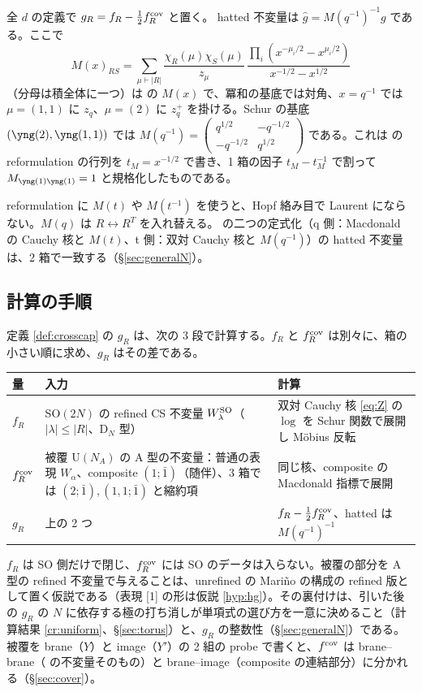 \begin{definition}\label{def:crosscap}
全 $d$ の定義で $g_R = f_R - \tfrac12 f^{\mathrm{cov}}_R$ と置く。
hatted 不変量は $\hat g = M(q^{-1})^{-1} g$ である。ここで
\[
M(x)_{RS} = \sum_{\mu \vdash |R|} \frac{\chi_R(\mu)\chi_S(\mu)}{z_\mu}\,\frac{\prod_i (x^{-\mu_i/2} - x^{\mu_i/2})}{x^{-1/2} - x^{1/2}}
\]
（分母は積全体に一つ）は \cite{KN17} の $M(x)$ で、冪和の基底では対角、$x = q^{-1}$ では $\mu = (1,1)$ に $z_q$、$\mu = (2)$ に $z_q^+$ を掛ける。Schur の基底 $(\ytwo, \yoneone)$ では $M(q^{-1}) = \begin{pmatrix} q^{1/2} & -q^{-1/2} \\ -q^{-1/2} & q^{1/2}\end{pmatrix}$ である。これは \cite{Marino09} の reformulation の行列を $t_M = x^{-1/2}$ で書き、1 箱の因子 $t_M - t_M^{-1}$ で割って $M_{\yone\yone} = 1$ と規格化したものである。
\end{definition}

\begin{remark}
reformulation に $M(t)$ や $M(t^{-1})$ を使うと、Hopf 絡み目で Laurent にならない。$M(q)$ は $R \leftrightarrow R^T$ を入れ替える。
\cite{KN17} の二つの定式化（q 側：Macdonald の Cauchy 核と $M(t)$、t 側：双対 Cauchy 核と $M(q^{-1})$）の hatted 不変量は、2 箱で一致する（§\ref{sec:generalN}）。
\end{remark}

\subsection{計算の手順}\label{sec:procedure}
定義 \ref{def:crosscap} の $g_R$ は、次の 3 段で計算する。$f_R$ と $f^{\mathrm{cov}}_R$ は別々に、箱の小さい順に求め、$g_R$ はその差である。
\begin{center}
\small
\begin{tabular}{lp{6.6cm}p{5.2cm}}
\toprule
量 & 入力 & 計算 \\
\midrule
$f_R$ & SO$(2N)$ の refined CS 不変量 $W^{\mathrm{SO}}_\lambda$（$|\lambda| \le |R|$、D$_N$ 型） & 双対 Cauchy 核 \eqref{eq:Z} の $\log$ を Schur 関数で展開し Möbius 反転 \\
$f^{\mathrm{cov}}_R$ & 被覆 U$(N_A)$ の A 型の不変量：普通の表現 $W_\alpha$、composite $(1;\bar 1)$（随伴）、3 箱では $(2;\bar 1), (1,1;\bar 1)$ と縮約項 & 同じ核、composite の Macdonald 指標で展開 \\
$g_R$ & 上の 2 つ & $f_R - \tfrac12 f^{\mathrm{cov}}_R$、hatted は $M(q^{-1})^{-1}$ \\
\bottomrule
\end{tabular}
\end{center}
$f_R$ は SO 側だけで閉じ、$f^{\mathrm{cov}}_R$ には SO のデータは入らない。被覆の部分を A 型の refined 不変量で与えることは、unrefined の Mariño の構成の refined 版として置く仮説である（表現 [1] の形は仮説 \ref{hyp:hg}）。その裏付けは、引いた後の $g_R$ の $N$ に依存する極の打ち消しが単項式の選び方を一意に決めること（計算結果 \ref{cr:uniform}、§\ref{sec:torus}）と、$g_R$ の整数性（§\ref{sec:generalN}）である。
被覆を brane（$Y$）と image（$Y'$）の 2 組の probe で書くと、$f^{\mathrm{cov}}$ は brane--brane（\cite{KN17} の不変量そのもの）と brane--image（composite の連結部分）に分かれる（§\ref{sec:cover}）。

